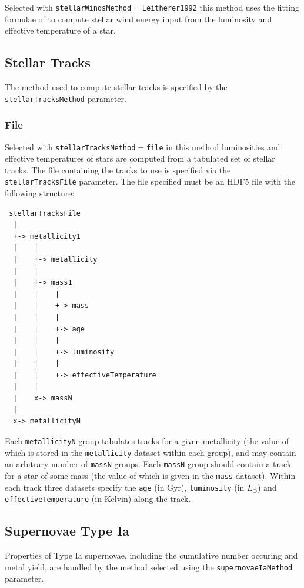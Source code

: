 Selected with {\tt stellarWindsMethod}$=${\tt Leitherer1992} this method uses the fitting formulae of \cite{leitherer_deposition_1992} to compute stellar wind energy input from the luminosity and effective temperature of a star.

\subsection{Stellar Tracks}

The method used to compute stellar tracks is specified by the {\tt stellarTracksMethod} parameter.

\subsubsection{File}\label{sec:StellarTracksFile}

Selected with {\tt stellarTracksMethod}$=${\tt file} in this method luminosities and effective temperatures of stars are computed from a tabulated set of stellar tracks. The file containing the tracks to use is specified via the {\tt stellarTracksFile} parameter. The file specified must be an HDF5 file with the following structure:
\begin{verbatim}
 stellarTracksFile
  |
  +-> metallicity1
  |    |
  |    +-> metallicity
  |    |
  |    +-> mass1
  |    |    |
  |    |    +-> mass
  |    |    |
  |    |    +-> age
  |    |    |
  |    |    +-> luminosity
  |    |    |
  |    |    +-> effectiveTemperature
  |    |
  |    x-> massN
  |
  x-> metallicityN
\end{verbatim}
Each {\tt metallicityN} group tabulates tracks for a given metallicity (the value of which is stored in the {\tt metallicity} dataset within each group), and may contain an arbitrary number of {\tt massN} groups. Each {\tt massN} group should contain a track for a star of some mass (the value of which is given in the {\tt mass} dataset). Within each track three datasets specify the {\tt age} (in Gyr), {\tt luminosity} (in $L_\odot$) and {\tt effectiveTemperature} (in Kelvin) along the track.

\subsection{Supernovae Type Ia}

Properties of Type Ia supernovae, including the cumulative number occuring and metal yield, are handled by the method selected using the {\tt supernovaeIaMethod} parameter.

